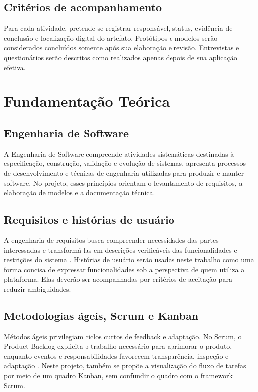 \documentclass[12pt,a4paper,oneside]{report}
\begin{document}
\section{Critérios de acompanhamento}
Para cada atividade, pretende-se registrar responsável, status, evidência de conclusão e localização digital do artefato. Protótipos e modelos serão considerados concluídos somente após sua elaboração e revisão. Entrevistas e questionários serão descritos como realizados apenas depois de sua aplicação efetiva.

\chapter{Fundamentação Teórica}
\section{Engenharia de Software}
A Engenharia de Software compreende atividades sistemáticas destinadas à especificação, construção, validação e evolução de sistemas. \citet{sommerville2016} apresenta processos de desenvolvimento e técnicas de engenharia utilizadas para produzir e manter software. No projeto, esses princípios orientam o levantamento de requisitos, a elaboração de modelos e a documentação técnica.

\section{Requisitos e histórias de usuário}
A engenharia de requisitos busca compreender necessidades das partes interessadas e transformá-las em descrições verificáveis das funcionalidades e restrições do sistema \citep{sommerville2016}. Histórias de usuário serão usadas neste trabalho como uma forma concisa de expressar funcionalidades sob a perspectiva de quem utiliza a plataforma. Elas deverão ser acompanhadas por critérios de aceitação para reduzir ambiguidades.

\section{Metodologias ágeis, Scrum e Kanban}
Métodos ágeis privilegiam ciclos curtos de feedback e adaptação. No Scrum, o Product Backlog explicita o trabalho necessário para aprimorar o produto, enquanto eventos e responsabilidades favorecem transparência, inspeção e adaptação \citep{schwaber2020}. Neste projeto, também se propõe a visualização do fluxo de tarefas por meio de um quadro Kanban, sem confundir o quadro com o framework Scrum.
\end{document}
